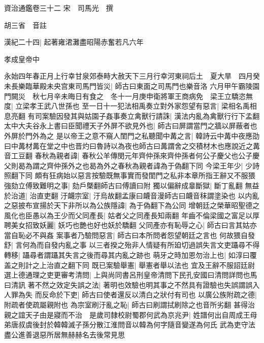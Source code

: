 資治通鑑卷三十二
宋　司馬光　撰

胡三省　音註

漢紀二十四|{
	起著雍涒灘盡昭陽赤奮若凡六年}


孝成皇帝中

永始四年春正月上行幸甘泉郊泰畤大赦天下三月行幸河東祠后土　夏大旱　四月癸未長樂臨華殿未央宫東司馬門皆災|{
	師古曰東面之司馬門也樂音洛}
六月甲午霸陵園門闕災　秋七月辛未晦日有食之　冬十一月庚申衛將軍王商病免　梁王立驕恣無度|{
	立梁孝王武八世孫也}
至一日十一犯法相禹奏立對外家怨望有惡言|{
	梁相名禹相息亮翻}
有司案驗因發其與姑園子姦事奏立禽獸行請誅|{
	漢法内亂為禽獸行行下孟翻}
太中大夫谷永上書曰臣聞禮天子外屏不欲見外也|{
	師古曰屏謂當門之牆以屏蔽者也外屏於門外為之}
是以帝王之意不窺人閨門之私聽聞中冓之言|{
	韓詩云中冓中夜應劭曰中冓材冓在堂之中也晋灼曰魯詩以為夜也師古曰冓謂舍之交積材木也應說近之冓音工豆翻}
春秋為親者諱|{
	春秋公羊傳閔元年齊仲孫來齊仲孫者何公子慶父也公子慶父則曷為謂之齊仲孫外之也曷為外之春秋為親者諱為于偽翻下同}
今梁王年少|{
	少詩照翻下同}
頗有狂病始以惡言按驗既無事實而發閨門之私非本章所指王辭又不服猥強劾立傅致難明之事|{
	劾戶槩翻師古曰傅讀曰附}
獨以偏辭成辠斷獄|{
	斷丁亂翻}
無益於治道|{
	治直吏翻}
汙衊宗室|{
	汙烏故翻孟康曰衊音漫師古曰衊音秣謂塗染也}
以内亂之惡披布宣揚於天下非所以為公族隱諱|{
	為于偽翻下為公同}
增朝廷之榮華昭聖德之風化也臣愚以為王少而父同產長|{
	姑者父之同產長知兩翻}
年齒不倫梁國之富足以厚聘美女招致妖麗|{
	妖巧也艷也好也妖於驕翻}
父同產亦有恥辱之心|{
	師古曰言其姑亦當自恥必不與姦}
案事者乃驗問惡言|{
	師古曰本所問者怨望朝廷之言也}
何故猥自發舒|{
	言何為而自發内亂之事}
以三者揆之殆非人情疑有所廹切過誤失言文吏躡尋不得轉移|{
	躡尋者謂躡其失言之後而尋其内亂之跡也}
萌牙之時加恩勿治上也|{
	如淳曰覆盖之則計之上治直之翻下同}
既已案驗舉憲|{
	舉憲者舉以法也}
宜及王辭不服詔廷尉選上德通理之吏更審考清問|{
	上與尚同書呂刑皇帝清問下民孔安國曰清問詳問也馬曰清訊}
著不然之效定失誤之法|{
	著明也效驗也明其事之不然具有證驗也失誤謂誤入人罪為失}
而反命於下吏|{
	師古曰使者還反以清白之狀付有司也}
以廣公族附疏之德|{
	附疏者使疏屬親附也}
為宗室刷汙亂之恥|{
	師古曰刷謂拭刷除之也音所劣翻}
甚得治親之誼天子由是寢而不治　是歲司隸校尉蜀郡何武為京兆尹|{
	姓譜何出自周成王母弟唐叔虞後封於韓韓滅子孫分散江淮問音以韓為何字隨音變遂為何氏}
武為吏守法盡公進善退惡所居無赫赫名去後常見思

